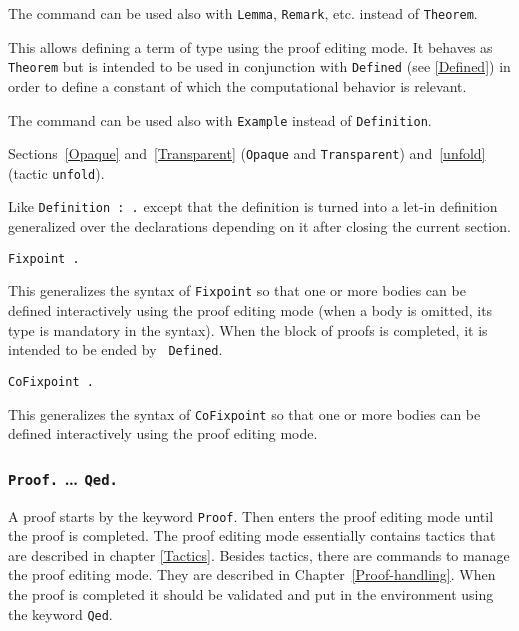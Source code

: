 \begin{Variants}
The command can be used also with {\tt Lemma},
{\tt Remark}, etc. instead of {\tt Theorem}.

\item {}

This allows defining a term of type {\type} using the proof editing mode. It
behaves as {\tt Theorem} but is intended to be used in conjunction with
  {\tt Defined} (see \ref{Defined}) in order to define a
 constant of which the computational behavior is relevant.

The command can be used also with {\tt Example} instead
of {\tt Definition}.

\SeeAlso Sections~\ref{Opaque} and~\ref{Transparent} ({\tt Opaque}
and {\tt Transparent}) and~\ref{unfold} (tactic {\tt unfold}).

\item {}

Like {\tt Definition {\ident} \zeroone{\binders} : {\type}.} except
that the definition is turned into a let-in definition generalized over
the declarations depending on it after closing the current section.

\item {\tt Fixpoint .}

This generalizes the syntax of {\tt Fixpoint} so that one or more
bodies can be defined interactively using the proof editing mode (when
a body is omitted, its type is mandatory in the syntax). When the
block of proofs is completed, it is intended to be ended by {\tt
  Defined}.

\item {\tt CoFixpoint .}

This generalizes the syntax of {\tt CoFixpoint} so that one or more bodies
can be defined interactively using the proof editing mode.

\end{Variants}

\subsubsection{{\tt Proof.} {\dots} {\tt Qed.}
}

A proof starts by the keyword {\tt Proof}.  Then {\Coq} enters the
proof editing mode until the proof is completed. The proof editing
mode essentially contains tactics that are described in chapter
\ref{Tactics}. Besides tactics, there are commands to manage the proof
editing mode. They are described in Chapter~\ref{Proof-handling}. When
the proof is completed it should be validated and put in the
environment using the keyword {\tt Qed}.
\medskip

